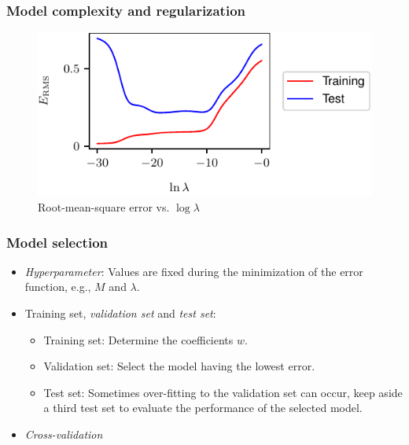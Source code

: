 \documentclass{beamer}
\begin{document}
\begin{frame}
    \frametitle{Model complexity and regularization}
    \begin{figure}
        \caption{Root-mean-square error vs. $\log\lambda$}
        \includegraphics{Figure_10.pdf}
    \end{figure}
\end{frame}

\begin{frame}
    \frametitle{Model selection}
    \begin{itemize}
        \item \emph{Hyperparameter}: Values are fixed during the minimization of the error function, e.g., $M$ and $\lambda$.
        \item Training set, \emph{validation set} and \emph{test set}:
        \begin{itemize}
            \item Training set: Determine the coefficients $w$.
            \item Validation set: Select the model having the lowest error.
            \item Test set: Sometimes over-fitting to the validation set can occur, keep aside a third test set to evaluate the performance of the selected model.
        \end{itemize}
        \item \emph{Cross-validation}
    \end{itemize}
\end{frame}
\end{document}
